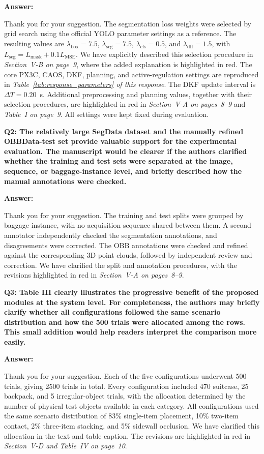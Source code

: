 \documentclass[journal,10pt]{IEEEtran}
\newcommand{\question}[2]{%
  \par\smallskip\noindent
  {\color{responseblue}\bfseries\clubpenalty=10000\widowpenalty=10000 Q#1: #2\par}%
  \par\nobreak\noindent
}
\newcommand{\answer}{%
  \par\smallskip\noindent
  \textbf{Answer: }\ignorespaces
}
\begin{document}
\answer
Thank you for your suggestion. The segmentation loss weights were selected by grid search using the official YOLO parameter settings as a reference. The resulting values are $\lambda_{\mathrm{box}}=7.5$, $\lambda_{\mathrm{seg}}=7.5$, $\lambda_{\mathrm{cls}}=0.5$, and $\lambda_{\mathrm{dfl}}=1.5$, with $L_{\mathrm{seg}}=L_{\mathrm{mask}}+0.1L_{\mathrm{MSE}}$. We have explicitly described this selection procedure in \textit{Section~V-B on page~9}, where the added explanation is highlighted in red. The core PX3C, CAOS, DKF, planning, and active-regulation settings are reproduced in \textit{Table~\ref{tab:response_parameters} of this response}. The DKF update interval is $\Delta T=0.20$~s. Additional preprocessing and planning values, together with their selection procedures, are highlighted in red in \textit{Section~V-A on pages~8--9} and \textit{Table~I on page~9}. All settings were kept fixed during evaluation.

\question{2}{The relatively large SegData dataset and the manually refined OBBData-test set provide valuable support for the experimental evaluation. The manuscript would be clearer if the authors clarified whether the training and test sets were separated at the image, sequence, or baggage-instance level, and briefly described how the manual annotations were checked.}

\answer
Thank you for your suggestion. The training and test splits were grouped by baggage instance, with no acquisition sequence shared between them. A second annotator independently checked the segmentation annotations, and disagreements were corrected. The OBB annotations were checked and refined against the corresponding 3D point clouds, followed by independent review and correction. We have clarified the split and annotation procedures, with the revisions highlighted in red in \textit{Section~V-A on pages~8--9}.

\question{3}{Table III clearly illustrates the progressive benefit of the proposed modules at the system level. For completeness, the authors may briefly clarify whether all configurations followed the same scenario distribution and how the 500 trials were allocated among the rows. This small addition would help readers interpret the comparison more easily.}

\answer
Thank you for your suggestion. Each of the five configurations underwent 500 trials, giving 2500 trials in total. Every configuration included 470 suitcase, 25 backpack, and 5 irregular-object trials, with the allocation determined by the number of physical test objects available in each category. All configurations used the same scenario distribution of 83\% single-item placement, 10\% two-item contact, 2\% three-item stacking, and 5\% sidewall occlusion. We have clarified this allocation in the text and table caption. The revisions are highlighted in red in \textit{Section~V-D and Table~IV on page~10}.
\end{document}
